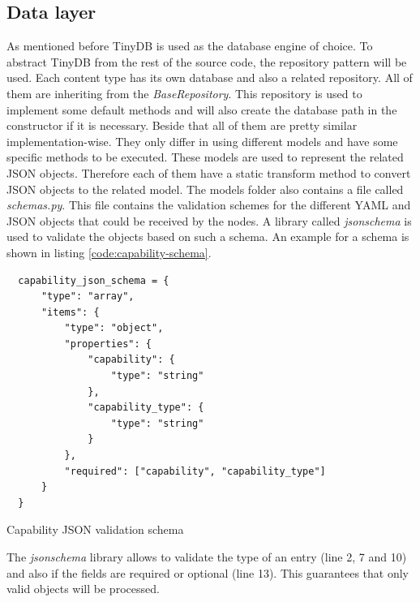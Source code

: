 \subsection{Data layer}
\label{subsection:impl-data-layer}
As mentioned before TinyDB is used as the database engine of choice.
To abstract TinyDB from the rest of the source code, the repository pattern will be used.
Each content type has its own database and also a related repository.
All of them are inheriting from the \textit{BaseRepository}.
This repository is used to implement some default methods and will also create the database path in the constructor if it is necessary.
Beside that all of them are pretty similar implementation-wise.
They only differ in using different models and have some specific methods to be executed.
These models are used to represent the related \ac{JSON} objects.
Therefore each of them have a static transform method to convert \ac{JSON} objects to the related model.
The models folder also contains a file called \textit{schemas.py}.
This file contains the validation schemes for the different \ac{YAML} and \ac{JSON} objects that could be received by the nodes.
A library called \textit{jsonschema} is used to validate the objects based on such a schema.
An example for a schema is shown in listing \ref{code:capability-schema}.
\begin{listing}[H]
  \begin{verbatim}
  capability_json_schema = {
      "type": "array",
      "items": {
          "type": "object",
          "properties": {
              "capability": {
                  "type": "string"
              },
              "capability_type": {
                  "type": "string"
              }
          },
          "required": ["capability", "capability_type"]
      }
  }
  \end{verbatim}
  \caption[Capability JSON validation schema]{Capability \ac{JSON} validation schema}
  \label{code:capability-schema}
\end{listing}
The \textit{jsonschema} library allows to validate the type of an entry (line 2, 7 and 10) and also if the fields are required or optional (line 13).
This guarantees that only valid objects will be processed.

